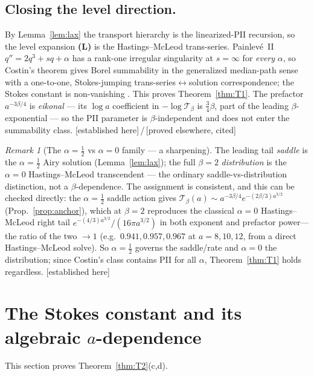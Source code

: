 \documentclass[11pt,reqno]{amsart}
\theoremstyle{plain}
\theoremstyle{definition}
\theoremstyle{remark}
\newtheorem{remark}[theorem]{Remark}
\newcommand{\tagPr}{{\footnotesize\textsf{[established here]}}}
\newcommand{\tagP}{{\footnotesize\textsf{[proved elsewhere, cited]}}}
\begin{document}
\subsection{Closing the level direction.}
By Lemma~\ref{lem:lax} the transport hierarchy is the linearized-PII recursion, so the level
expansion \textbf{(L)} is the Hastings--McLeod trans-series. Painlev\'e~II $q''=2q^3+sq+\alpha$ has a
rank-one irregular singularity at $s=\infty$ for \emph{every} $\alpha$, so Costin's theorem
\cite{Costin} gives Borel summability in the generalized median-path sense with a one-to-one,
Stokes-jumping trans-series$\leftrightarrow$solution correspondence; the Stokes constant is
non-vanishing \cite{CCK}. This proves Theorem~\ref{thm:T1}. The prefactor $a^{-3\beta/4}$ is
\emph{eikonal} --- its $\log a$ coefficient in $-\log\mathcal T_\beta$ is $\tfrac34\beta$, part of the
leading $\beta$-exponential --- so the PII parameter is $\beta$-independent and does not enter the summability class.
\tagPr\,/\,\tagP

\begin{remark}[The $\alpha=\tfrac12$ vs $\alpha=0$ family --- a sharpening]\label{rem:family}
The leading tail \emph{saddle} is the $\alpha=\tfrac12$ Airy solution (Lemma~\ref{lem:lax}); the full
$\beta=2$ \emph{distribution} is the $\alpha=0$ Hastings--McLeod transcendent --- the ordinary
saddle-vs-distribution distinction, not a $\beta$-dependence. The assignment is consistent, and this
can be checked directly: the $\alpha=\tfrac12$ saddle action gives
$\mathcal T_\beta(a)\sim a^{-3\beta/4}e^{-(2\beta/3)a^{3/2}}$ (Prop.~\ref{prop:anchor}), which at
$\beta=2$ reproduces the classical $\alpha=0$ Hastings--McLeod right tail
$e^{-(4/3)a^{3/2}}/(16\pi a^{3/2})$ \cite{TW1994} in both exponent and prefactor power---the ratio of
the two $\to1$ (e.g.\ $0.941,0.957,0.967$ at $a=8,10,12$, from a direct Hastings--McLeod solve). So
$\alpha=\tfrac12$ governs the saddle/rate and $\alpha=0$ the distribution; since Costin's class
contains PII for all $\alpha$, Theorem~\ref{thm:T1} holds regardless. \tagPr
\end{remark}

\section{The Stokes constant and its algebraic $a$-dependence}\label{sec:stokes}

This section proves Theorem~\ref{thm:T2}(c,d).
\end{document}
